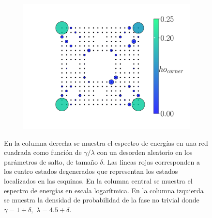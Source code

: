 \begin{figure}[h!]
\begin{minipage}[h!]{0.9\textwidth}
\begin{subfigure}[b!]{0.3 \textwidth}
             \label{}
         \end{subfigure}\hspace*{-0.5em}
         \begin{subfigure}[b!]{0.4 \textwidth}
             \caption{}
             \includegraphics[width=\textwidth]{Imagenes/Resultados_Hoti_Fractal/proyection_square_0.5.pdf}
             \label{}
         \end{subfigure}\hspace*{-0.5em}
     \end{minipage}\vspace*{-2em}
     
     
    \caption{En la columna derecha se muestra el espectro de energías en una red cuadrada como función de $\gamma/\lambda $ con un desorden aleatorio en los parámetros de salto, de tamaño $\delta$. Las lineas rojas corresponden a los cuatro estados degenerados que representan los estados localizados en las esquinas. En la columna central se muestra el espectro de energías en escala logarítmica. En la columna izquierda se muestra la densidad de probabilidad de la fase no trivial donde $\gamma = 1 + \delta ,\, \, \lambda = 4.5 + \delta $.  }
    \label{fig:para_proy_Delta_fractal}
\end{figure}